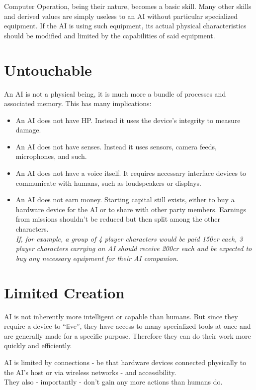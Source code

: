 \documentclass[12pt,a4paper,openany]{book}
\begin{document}
	Computer Operation, being their nature, becomes a basic skill. Many other skills and derived values are simply useless to an AI without particular specialized equipment. If the AI is using such equipment, its actual physical characteristics should be modified and limited by the capabilities of said equipment.

	\chapter{Untouchable}
	An AI is not a physical being, it is much more a bundle of processes and associated memory. This has many implications:
	\vspace{-8mm}
	\begin{itemize}
		\setlength\itemsep{-8mm}
		\item An AI does not have HP. Instead it uses the device’s integrity to measure damage.
		\item An AI does not have senses. Instead it uses sensors, camera feeds, microphones, and such.
		\item An AI does not have a voice itself. It requires necessary interface devices to communicate with humans, such as loudspeakers or displays.
		\item An AI does not earn money. Starting capital still exists, either to buy a hardware device for the AI or to share with other party members. Earnings from missions shouldn’t be reduced but then split among the other characters.\\
			\textit{If, for example, a group of 4 player characters would be paid 150cr each, 3 player characters carrying an AI should receive 200cr each and be expected to buy any necessary equipment for their AI companion.}
	\end{itemize}

	\chapter{Limited Creation}
	AI is not inherently more intelligent or capable than humans. But since they require a device to “live”, they have access to many specialized tools at once and are generally made for a specific purpose. Therefore they can do their work more quickly and efficiently.
	\par
	AI is limited by connections - be that hardware devices connected physically to the AI's host or via wireless networks - and accessibility.
	\\%
	They also - importantly - don’t gain any more actions than humans do.
\end{document}
